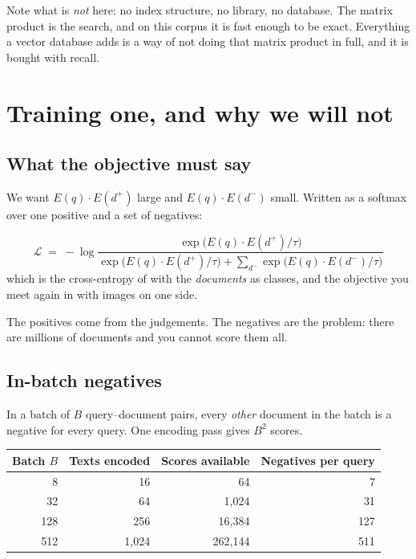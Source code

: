 \documentclass[11pt,a4paper]{article}
\begin{document}
Note what is \emph{not} here: no index structure, no library, no database. The
matrix product is the search, and on this corpus it is fast enough to be exact.
Everything a vector database adds is a way of not doing that matrix product in
full, and it is bought with recall.

\section{Training one, and why we will not}

\subsection{What the objective must say}

We want $E(q)\cdot E(d^{+})$ large and $E(q)\cdot E(d^{-})$ small. Written as a
softmax over one positive and a set of negatives:

\begin{derivbox}[title={The contrastive objective}]
\[
  \mathcal{L} \;=\; -\log
  \frac{\exp\!\big(E(q)\cdot E(d^{+})/\tau\big)}
       {\exp\!\big(E(q)\cdot E(d^{+})/\tau\big)
        + \sum_{d^{-}}\exp\!\big(E(q)\cdot E(d^{-})/\tau\big)}
\]
which is the cross-entropy of  with the \emph{documents} as
classes, and the objective you meet again in  with images on one
side.
\end{derivbox}

The positives come from the judgements. The negatives are the problem: there
are millions of documents and you cannot score them all.

\subsection{In-batch negatives}

In a batch of $B$ query--document pairs, every \emph{other} document in the
batch is a negative for every query. One encoding pass gives $B^2$ scores.

\begin{center}
\small
\begin{tabular}{rrrr}
\toprule
\textbf{Batch $B$} & \textbf{Texts encoded} & \textbf{Scores available} &
\textbf{Negatives per query} \\
\midrule
8   & 16    & 64      & 7 \\
32  & 64    & 1{,}024 & 31 \\
128 & 256   & 16{,}384 & 127 \\
512 & 1{,}024 & 262{,}144 & 511 \\
\bottomrule
\end{tabular}
\end{center}
\end{document}
